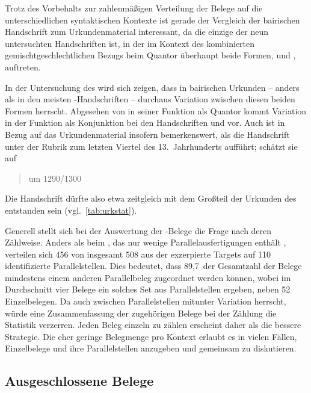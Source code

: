Trotz des Vorbehalts zur zahlenmäßigen Verteilung der Belege auf die
unterschiedlichen syntaktischen Kontexte ist gerade der Vergleich der
bairischen Handschrift \citet{kc:B1} zum Urkunden\-material interessant, da
\citet{kc:B1} die einzige der neun untersuchten Handschriften ist, in der im
Kontext des kombinierten gemischtgeschlechtlichen Bezugs beim Quantor
 überhaupt beide Formen,  und , auftreten.

In der Untersuchung des \CAO{} wird sich zeigen, dass in bairischen
Urkunden -- anders als in den meisten \KC{}-Handschriften -- durchaus
Variation zwischen diesen beiden Formen herrscht. Abgesehen von  in
seiner Funktion als Quantor kommt Variation in der Funktion als Konjunktion bei
den Handschriften \citet{kc:A1} und \citet{kc:VB} vor. Auch \citet{kc:VB} ist
in Bezug auf das Urkundenmaterial insofern bemerkenswert, als
\citet[224]{schneider1987a} die Handschrift \citet{kc:VB} unter der Rubrik zum
letzten Viertel des 13.~Jahrhunderts aufführt; \citeauthor{wolf:kckat} schätzt
sie auf \blockcquote[65]{wolf:kckat}{um 1290/1300}. Die Handschrift dürfte also
etwa zeitgleich mit dem Großteil der Urkunden des \CAO{} entstanden
sein (vgl.~\cref{tab:urkstat}).

Generell stellt sich bei der Auswertung der \KC{}-Belege die Frage
nach deren Zählweise. Anders als beim \CAO{}, das nur wenige
Parallelausfertigungen enthält \autocite[vgl.][326--328]{ganslmayeretal2003},
verteilen sich 456 von insgesamt 508 aus der \KC{} exzerpierte
Targets auf 110 identifizierte Parallelstellen. Dies bedeutet,
dass 89,7\pct\ der Gesamtzahl der Belege mindestens einem anderen Parallelbeleg
zugeordnet werden können, wobei im Durchschnitt vier Belege ein solches Set aus
Parallelstellen ergeben, neben 52 Einzelbelegen.
Da auch zwischen Parallelstellen mitunter Variation herrscht, würde eine
Zusammenfassung der zugehörigen Belege bei der Zählung die Statistik verzerren.
Jeden Beleg einzeln zu zählen erscheint daher als die bessere Strategie. Die
eher geringe Belegmenge pro Kontext erlaubt es in vielen Fällen, Einzelbelege
und ihre Parallelstellen anzugeben und gemeinsam zu diskutieren.

\subsection{Ausgeschlossene Belege}
\label{subsec:ausgeschlossene_kc}

